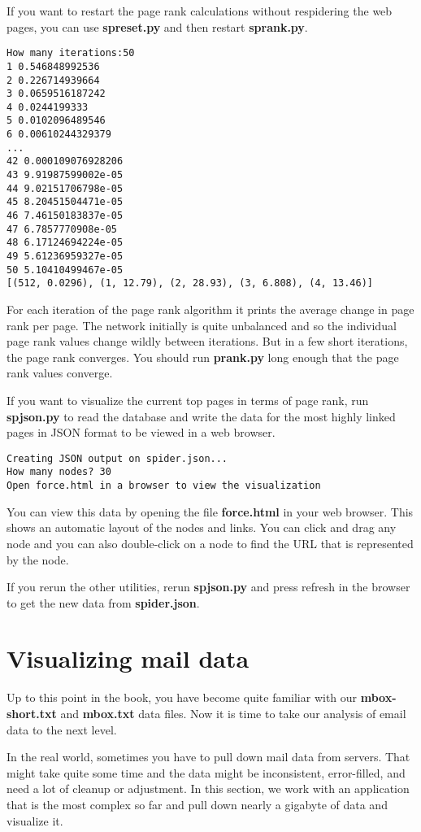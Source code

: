 If you want to restart the page rank calculations without respidering the 
web pages, you can use {\bf spreset.py} and then restart {\bf sprank.py}.

\beforeverb
\begin{verbatim}
How many iterations:50
1 0.546848992536
2 0.226714939664
3 0.0659516187242
4 0.0244199333
5 0.0102096489546
6 0.00610244329379
...
42 0.000109076928206
43 9.91987599002e-05
44 9.02151706798e-05
45 8.20451504471e-05
46 7.46150183837e-05
47 6.7857770908e-05
48 6.17124694224e-05
49 5.61236959327e-05
50 5.10410499467e-05
[(512, 0.0296), (1, 12.79), (2, 28.93), (3, 6.808), (4, 13.46)]
\end{verbatim}
\afterverb
%
For each iteration of the page rank algorithm it prints the average
change in page rank per page.   The network initially is quite
unbalanced and so the individual page rank values change wildly between
iterations. But in a few short iterations, the page rank converges.  You
should run {\bf prank.py} long enough that the page rank values converge.

If you want to visualize the current top pages in terms of page rank,
run {\bf spjson.py} to read the database and write the data for the 
most highly linked pages in JSON format to be viewed in a
web browser.

\beforeverb
\begin{verbatim}
Creating JSON output on spider.json...
How many nodes? 30
Open force.html in a browser to view the visualization
\end{verbatim}
\afterverb
%
You can view this data by opening the file {\bf force.html} in your web browser.  
This shows an automatic layout of the nodes and links.  You can click and 
drag any node and you can also double-click on a node to find the URL
that is represented by the node.

If you rerun the other utilities, rerun {\bf spjson.py} and
press refresh in the browser to get the new data from {\bf spider.json}.

\section{Visualizing mail data}

Up to this point in the book, you have become quite familiar with our 
{\bf mbox-short.txt} and {\bf mbox.txt} data files.   Now it is time to take
our analysis of email data to the next level.  

In the real world, sometimes you have to pull down mail data from servers.
That might take quite some time and the data might be inconsistent, 
error-filled, and need a lot of cleanup or adjustment.  In this section, we
work with an application that is the most complex so far and pull down nearly a 
gigabyte of data and visualize it.

